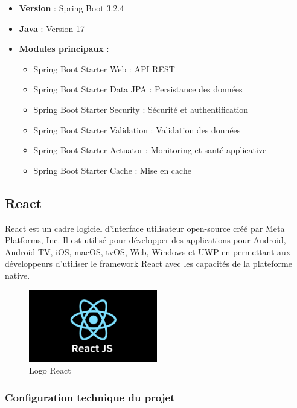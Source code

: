 \documentclass[12pt,a4paper]{report}
\begin{document}
\begin{itemize}
\item \textbf{Version} : Spring Boot 3.2.4
\item \textbf{Java} : Version 17
\item \textbf{Modules principaux} :
  \begin{itemize}
  \item Spring Boot Starter Web : API REST
  \item Spring Boot Starter Data JPA : Persistance des données
  \item Spring Boot Starter Security : Sécurité et authentification
  \item Spring Boot Starter Validation : Validation des données
  \item Spring Boot Starter Actuator : Monitoring et santé applicative
  \item Spring Boot Starter Cache : Mise en cache
  \end{itemize}
\end{itemize}

\subsection{React}

React est un cadre logiciel d'interface utilisateur open-source créé par Meta Platforms, Inc. Il est utilisé pour développer des applications pour Android, Android TV, iOS, macOS, tvOS, Web, Windows et UWP en permettant aux développeurs d'utiliser le framework React avec les capacités de la plateforme native.

\begin{figure}[H]
\centering
\includegraphics[width=0.5\textwidth]{latex_media/media/image24.png}
\caption{Logo React}
\label{fig:logo-react}
\end{figure}

\subsubsection{Configuration technique du projet}
\end{document}
